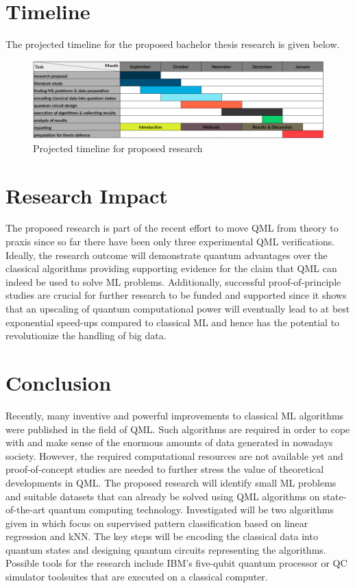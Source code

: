 \documentclass[a4paper]{article}
\newcommand*{\0}{$\ket{0}$}
\newcommand*{\1}{$\ket{1}$}
\begin{document}
\section{Timeline}
\label{sec:timeline}

The projected timeline for the proposed bachelor thesis research is given below.

\begin{figure}[!ht]
\centering
\includegraphics[scale=0.385]{ready_timeline.png}
\caption{Projected timeline for proposed research}
\end{figure}

\section{Research Impact}
\label{sec:research impact}
The proposed research is part of the recent effort to move QML from theory to praxis since so far there have been only three experimental QML verifications. Ideally, the research outcome will demonstrate quantum advantages over the classical algorithms providing supporting evidence for the claim that QML can indeed be used to solve ML problems. Additionally, successful proof-of-principle studies are crucial for further research to be funded and supported since it shows that an upscaling of quantum computational power will eventually lead to at best exponential speed-ups compared to classical ML and hence has the potential to revolutionize the handling of big data.

\section{Conclusion}
\label{sec:conclusion}
Recently, many inventive and powerful improvements to classical ML algorithms were published in the field of QML. Such algorithms are required in order to cope with and make sense of the enormous amounts of data generated in nowadays society. However, the required computational resources are not available yet and proof-of-concept studies are needed to further stress the value of theoretical developments in QML. The proposed research will identify small ML problems and suitable datasets that can already be solved using QML algorithms on state-of-the-art quantum computing technology. Investigated will be two algorithms given in \cite{Schuld2014, Schuld2016} which focus on supervised pattern classification based on linear regression and kNN. The key steps will be encoding the classical data into quantum states and designing quantum circuits representing the algorithms. Possible tools for the research include IBM's five-qubit quantum processor or QC simulator toolsuites that are executed on a classical computer.
\end{document}
